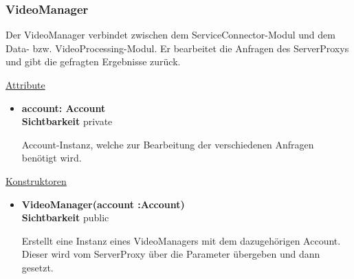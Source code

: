 \subsubsection{VideoManager}
Der VideoManager verbindet zwischen dem ServiceConnector-Modul und dem Data- bzw. VideoProcessing-Modul. Er bearbeitet die Anfragen des ServerProxys und gibt die gefragten Ergebnisse zurück.\newline

\underline{Attribute}
\begin{itemize}
\itemsep0pt
\item \textbf{account: Account} \hfill\\ 
\textbf{Sichtbarkeit} private 

Account-Instanz, welche zur Bearbeitung der verschiedenen Anfragen benötigt wird.

\end{itemize}

\underline{Konstruktoren}
\begin{itemize}
\itemsep0pt
\item \textbf{VideoManager(account :Account)} \hfill\\
\textbf{Sichtbarkeit} public

Erstellt eine Instanz eines VideoManagers mit dem dazugehörigen Account. Dieser wird vom ServerProxy über die Parameter übergeben und dann gesetzt.
\end{itemize}

